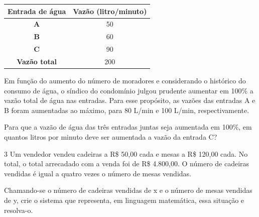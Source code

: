 \begin{escolha}
\begin{boxmedio}
\begin{boxmedio}
{\begin{boxpeq}
\begin{boxpeq}
{\begin{boxpeq}
\begin{boxmedio}
\begin{boxmedio}
\begin{boxpeq}
\begin{boxmedio}
\begin{boxpeq}
\begin{boxpeq}
\begin{boxpeq}
\begin{boxpeq}
\begin{boxmedio}
{\begin{table}[]
\begin{tabular}{|cc}
\hline
\textbf{Entrada de água} & \multicolumn{1}{c|}{\textbf{Vazão (litro/minuto)}} \\ \hline
\textbf{A} & 50 \\ \hline
\textbf{B} & 60 \\ \hline
\textbf{C} & 90 \\ \hline
\textbf{Vazão total} & 200 \\ \hline
\end{tabular}
\end{table}

Em função do aumento do número de moradores e considerando o histórico
do consumo de água, o síndico do condomínio julgou prudente aumentar em
100\% a vazão total de água nas entradas. Para esse propósito,
as vazões das entradas A e B foram aumentadas ao máximo, para 80 L/min e
100 L/min, respectivamente.

Para que a vazão de água das três entradas juntas seja aumentada em
100\%, em quantos litros por minuto deve ser aumentada a vazão da entrada C?



\num{3} Um vendedor vendeu cadeiras a R\$ 50,00 cada e mesas a R\$ 120,00
cada. No total, o total arrecadado com a venda foi de R\$ 4.800,00. O número 
de cadeiras vendidas é igual a quatro vezes o número de mesas vendidas.

Chamando-se o número de cadeiras vendidas de x e o número de mesas
vendidas de y, crie o sistema que representa, em linguagem
matemática, essa situação e resolva-o.

\begin{boxmedio}

\end{boxmedio}}
\end{boxmedio}
\end{boxpeq}
\end{boxpeq}
\end{boxpeq}
\end{boxpeq}
\end{boxmedio}
\end{boxpeq}
\end{boxmedio}
\end{boxmedio}
\end{boxpeq}}
\end{boxpeq}
\end{boxpeq}}
\end{boxmedio}
\end{boxmedio}
\end{escolha}
